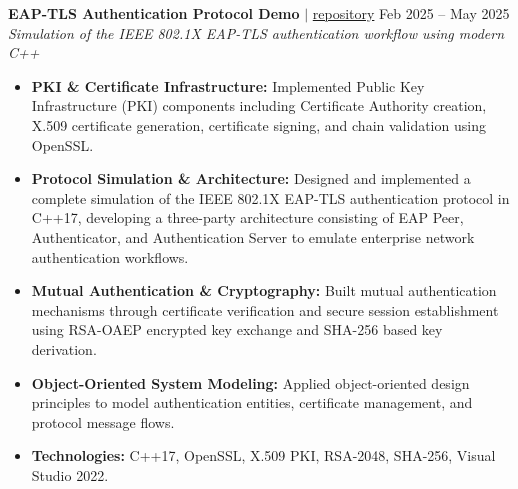 \documentclass[10pt,a4paper]{article}
\begin{document}
\noindent \textbf{EAP-TLS Authentication Protocol Demo} $|$ \href{https://github.com/vyquochuy/EAP-TLS-DEMO}{repository} \hfill Feb 2025 -- May 2025\\
\textit{Simulation of the IEEE 802.1X EAP-TLS authentication workflow using modern C++}
\begin{itemize}[leftmargin=0.25in, nosep]
    \item \textbf{PKI \& Certificate Infrastructure:} Implemented Public Key Infrastructure (PKI) components including Certificate Authority creation, X.509 certificate generation, certificate signing, and chain validation using OpenSSL.
    \item \textbf{Protocol Simulation \& Architecture:} Designed and implemented a complete simulation of the IEEE 802.1X EAP-TLS authentication protocol in C++17, developing a three-party architecture consisting of EAP Peer, Authenticator, and Authentication Server to emulate enterprise network authentication workflows.
    \item \textbf{Mutual Authentication \& Cryptography:} Built mutual authentication mechanisms through certificate verification and secure session establishment using RSA-OAEP encrypted key exchange and SHA-256 based key derivation.
    \item \textbf{Object-Oriented System Modeling:} Applied object-oriented design principles to model authentication entities, certificate management, and protocol message flows.
    \item \textbf{Technologies:} C++17, OpenSSL, X.509 PKI, RSA-2048, SHA-256, Visual Studio 2022.
\end{itemize}
\vspace{10pt}
\end{document}
